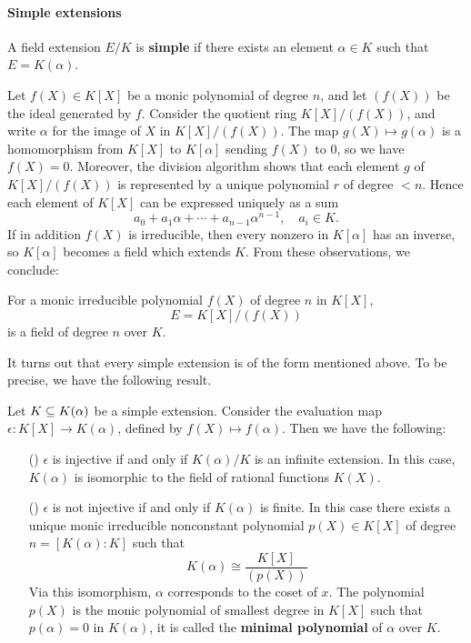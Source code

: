 \paragraph{Simple extensions}
\begin{definition}
A field extension $E/K$ is \textbf{simple} if there exists an element $\alpha\in K$ such that $E=K(\alpha)$.
\end{definition}
Let $f(X)\in K[X]$ be a monic polynomial of degree $n$, and let $(f(X))$ be the ideal generated by $f$. Consider the quotient ring $K[X]/(f(X))$, and write $\alpha$ for the image of $X$ in $K[X]/(f(X))$. The map $g(X)\mapsto g(\alpha)$ is a homomorphism from $K[X]$ to $K[\alpha]$ sending $f(X)$ to $0$, so we have $f(X)=0$. Moreover, the division algorithm shows that each element $g$ of $K[X]/(f(X))$ is represented by a unique polynomial $r$ of degree $<n$. Hence each element of $K[X]$ can be expressed uniquely as a sum
\[a_0+a_1\alpha+\cdots+a_{n-1}\alpha^{n-1},\quad a_i\in K.\]
If in addition $f(X)$ is irreducible, then every nonzero in $K[\alpha]$ has an inverse, so $K[\alpha]$ becomes a field which extends $K$. From these observations, we conclude:
\begin{proposition}
For a monic irreducible polynomial $f(X)$ of degree $n$ in $K[X]$,
\[E=K[X]/(f(X))\]
is a field of degree $n$ over $K$.
\end{proposition}
It turns out that every simple extension is of the form mentioned above. To be precise, we have the following result.
\begin{proposition}\label{field simple ext char}
Let $K\subseteq K(\alpha)$ be a simple extension. Consider the evaluation map $\epsilon:K[X]\to K(\alpha)$, defined by $f(X)\mapsto f(\alpha)$. Then we have the following:
\begin{itemize}
\item[(\rmnum{1})] $\epsilon$ is injective if and only if $K(\alpha)/K$ is an infinite extension. In this case, $K(\alpha)$ is isomorphic to the field of rational functions $K(X)$.
\item[(\rmnum{2})] $\epsilon$ is not injective if and only if $K(\alpha)$ is finite. In this case there exists a unique monic irreducible nonconstant polynomial $p(X)\in K[X]$ of degree $n=[K(\alpha):K]$ such that
\[K(\alpha)\cong\dfrac{K[X]}{(p(X))}\]
Via this isomorphism, $\alpha$ corresponds to the coset of $x$. The polynomial $p(X)$ is the monic polynomial of smallest degree in $K[X]$ such that $p(\alpha)=0$ in $K(\alpha)$, it is called the \textbf{minimal polynomial} of $\alpha$ over $K$.
\end{itemize}
\end{proposition}
